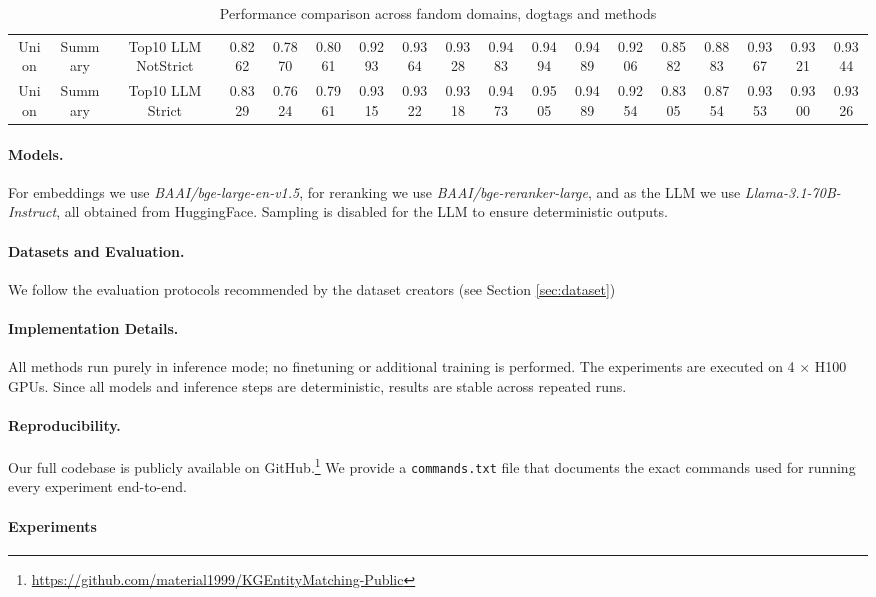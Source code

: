\documentclass[11pt]{article}
\begin{document}
\begin{table*}[h]
{\begin{tabular}{ccc|ccc|ccc|ccc|ccc|ccc}
Union & Summary & Top10 LLM NotStrict & 0.8262 & 0.7870 & 0.8061 & 0.9293 & 0.9364 & 0.9328 & 0.9483 & 0.9494 & 0.9489 & 0.9206 & 0.8582 & 0.8883 & 0.9367 & 0.9321 & 0.9344 \\
Union & Summary & Top10 LLM Strict & 0.8329 & 0.7624 & 0.7961 & 0.9315 & 0.9322 & 0.9318 & 0.9473 & 0.9505 & 0.9489 & 0.9254 & 0.8305 & 0.8754 & 0.9353 & 0.9300 & 0.9326 \\
\bottomrule
\end{tabular}
}
\vspace{-6px}
\caption{Performance comparison across fandom domains, dogtags and methods}
\label{tab:performance}
\end{table*}

\paragraph{Models.} 
For embeddings we use \emph{BAAI/bge-large-en-v1.5}, for reranking we use \emph{BAAI/bge-reranker-large}, 
and as the LLM we use \emph{Llama-3.1-70B-Instruct}, all obtained from HuggingFace. 
Sampling is disabled for the LLM to ensure deterministic outputs. 

\paragraph{Datasets and Evaluation.} 
We follow the evaluation protocols recommended by the dataset creators (see Section \ref{sec:dataset})

\paragraph{Implementation Details.} 
All methods run purely in inference mode; no finetuning or additional training is performed.
The experiments are executed on 4 × H100 GPUs. 
Since all models and inference steps are deterministic, results are stable across repeated runs. 

\paragraph{Reproducibility.} 
Our full codebase is publicly available on GitHub.\footnote{\url{https://github.com/material1999/KGEntityMatching-Public}} 
We provide a \texttt{commands.txt} file that documents the exact commands used for running every experiment end-to-end.

\paragraph{Experiments}
\end{document}
